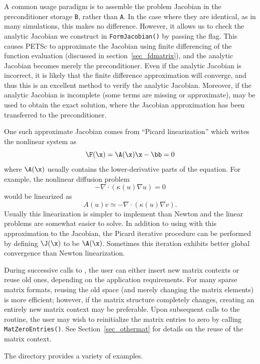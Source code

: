 A common usage paradigm is to assemble the problem Jacobian in the
preconditioner storage \lstinline{B}, rather than \lstinline{A}. In the case where they are
identical, as in many simulations, this makes no difference. However, it allows
us to check the analytic Jacobian we construct in \lstinline{FormJacobian()} by
passing the  flag. This causes PETSc to approximate the
Jacobian using finite differencing of the function evaluation (discussed in
section~\ref{sec_fdmatrix}), and the analytic Jacobian becomes merely the
preconditioner. Even if the analytic Jacobian is incorrect, it is likely that
the finite difference approximation will converge, and thus this is an excellent
method to verify the analytic Jacobian. Moreover, if the analytic Jacobian is
incomplete (some terms are missing or approximate),  may
be used to obtain the exact solution, where the Jacobian approximation has been
transferred to the preconditioner.

One such approximate Jacobian comes from ``Picard linearization'' which writes the nonlinear system as
\[ \F(\x) = \A(\x) \x - \bb = 0 \]
where $\A(\x)$ usually contains the lower-derivative parts of the equation.
For example, the nonlinear diffusion problem
\[ - \nabla\cdot(\kappa(u) \nabla u) = 0 \]
would be linearized as
\[ A(u) v \simeq -\nabla\cdot(\kappa(u) \nabla v). \]
Usually this linearization is simpler to implement than Newton and the linear problems are somewhat easier to solve.
In addition to using  with this approximation to the Jacobian, the Picard iterative procedure can be performed by defining
$\J(\x)$ to be $\A(\x)$.
Sometimes this iteration exhibits better global convergence than Newton linearization.

During successive calls to , the user can either
insert new matrix contexts or reuse old ones, depending on the
application requirements. For many sparse matrix formats, reusing the
old space (and merely changing the matrix elements) is more efficient;
however, if the matrix structure completely changes, creating an
entirely new matrix context may be preferable.
Upon subsequent calls to the
 routine, the user may wish to reinitialize the matrix
entries to zero by calling \lstinline{MatZeroEntries()}.  See
Section~\ref{sec_othermat} for details on the reuse of the matrix
context.

The directory  provides
a variety of examples.


